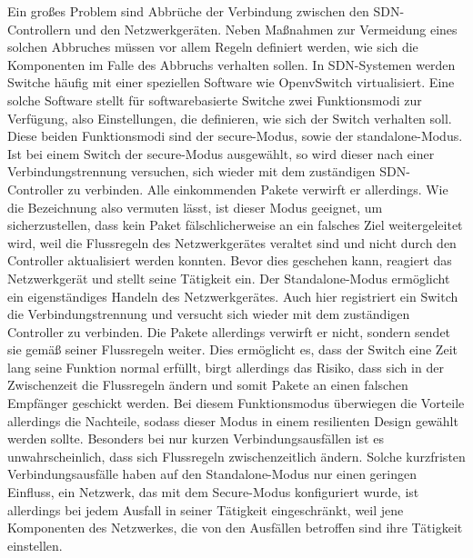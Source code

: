 Ein großes Problem sind Abbrüche der Verbindung zwischen den \ac{SDN}-Controllern und den Netzwerkgeräten. Neben Maßnahmen zur Vermeidung eines solchen Abbruches müssen vor allem Regeln definiert werden, 
wie sich die Komponenten im Falle des Abbruchs verhalten sollen. In \ac{SDN}-Systemen werden Switche häufig mit einer speziellen Software wie OpenvSwitch virtualisiert. 
Eine solche Software stellt für softwarebasierte Switche zwei Funktionsmodi zur Verfügung, also Einstellungen, die definieren, wie sich der Switch verhalten soll. Diese beiden Funktionsmodi sind der secure-Modus, 
sowie der standalone-Modus. Ist bei einem Switch der secure-Modus ausgewählt, so wird dieser nach einer Verbindungstrennung versuchen, sich wieder mit dem zuständigen \ac{SDN}-Controller zu verbinden. 
Alle einkommenden Pakete verwirft er allerdings. Wie die Bezeichnung also vermuten lässt, ist dieser Modus geeignet, um sicherzustellen, dass kein Paket fälschlicherweise an ein falsches Ziel weitergeleitet wird, 
weil die Flussregeln des Netzwerkgerätes veraltet sind und nicht durch den Controller aktualisiert werden konnten. Bevor dies geschehen kann, reagiert das Netzwerkgerät und stellt seine Tätigkeit ein. 
Der Standalone-Modus ermöglicht ein eigenständiges Handeln des Netzwerkgerätes. Auch hier registriert ein Switch die Verbindungstrennung und versucht sich wieder mit dem zuständigen Controller zu verbinden. 
Die Pakete allerdings verwirft er nicht, sondern sendet sie gemäß seiner Flussregeln weiter. Dies ermöglicht es, dass der Switch eine Zeit lang seine Funktion normal erfüllt, birgt allerdings das Risiko, 
dass sich in der Zwischenzeit die Flussregeln ändern und somit Pakete an einen falschen Empfänger geschickt werden.
Bei diesem Funktionsmodus überwiegen die Vorteile allerdings die Nachteile, sodass dieser Modus in einem resilienten Design gewählt werden sollte. Besonders bei nur kurzen Verbindungsausfällen ist es unwahrscheinlich, 
dass sich Flussregeln zwischenzeitlich ändern. Solche kurzfristen Verbindungsausfälle haben auf den Standalone-Modus nur einen geringen Einfluss, ein Netzwerk, das mit dem Secure-Modus konfiguriert wurde, 
ist allerdings bei jedem Ausfall in seiner Tätigkeit eingeschränkt, weil jene Komponenten des Netzwerkes, die von den Ausfällen betroffen sind ihre Tätigkeit einstellen.


